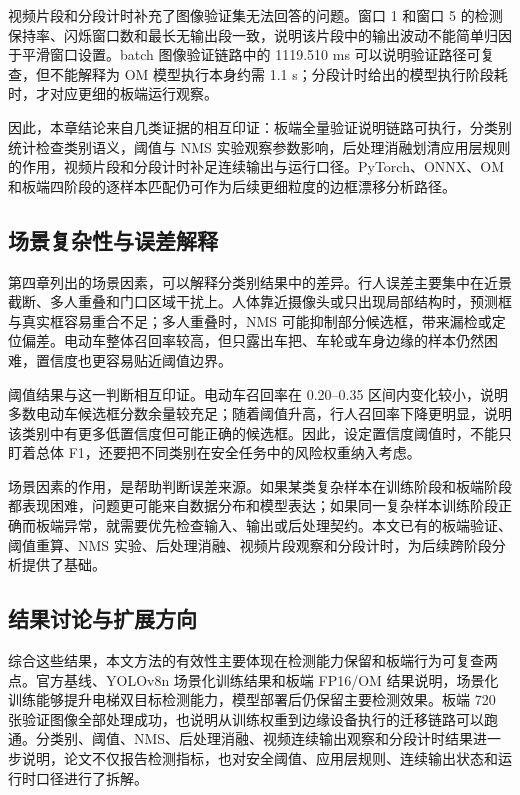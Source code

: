 视频片段和分段计时补充了图像验证集无法回答的问题。窗口 1 和窗口 5 的检测保持率、闪烁窗口数和最长无输出段一致，说明该片段中的输出波动不能简单归因于平滑窗口设置。batch 图像验证链路中的 1119.510 ms 可以说明验证路径可复查，但不能解释为 OM 模型执行本身约需 1.1 s；分段计时给出的模型执行阶段耗时，才对应更细的板端运行观察。

因此，本章结论来自几类证据的相互印证：板端全量验证说明链路可执行，分类别统计检查类别语义，阈值与 NMS 实验观察参数影响，后处理消融划清应用层规则的作用，视频片段和分段计时补足连续输出与运行口径。PyTorch、ONNX、OM 和板端四阶段的逐样本匹配仍可作为后续更细粒度的边框漂移分析路径。

\subsection{场景复杂性与误差解释}

第四章列出的场景因素，可以解释分类别结果中的差异。行人误差主要集中在近景截断、多人重叠和门口区域干扰上。人体靠近摄像头或只出现局部结构时，预测框与真实框容易重合不足；多人重叠时，NMS 可能抑制部分候选框，带来漏检或定位偏差。电动车整体召回率较高，但只露出车把、车轮或车身边缘的样本仍然困难，置信度也更容易贴近阈值边界。

阈值结果与这一判断相互印证。电动车召回率在 0.20--0.35 区间内变化较小，说明多数电动车候选框分数余量较充足；随着阈值升高，行人召回率下降更明显，说明该类别中有更多低置信度但可能正确的候选框。因此，设定置信度阈值时，不能只盯着总体 F1，还要把不同类别在安全任务中的风险权重纳入考虑。

场景因素的作用，是帮助判断误差来源。如果某类复杂样本在训练阶段和板端阶段都表现困难，问题更可能来自数据分布和模型表达；如果同一复杂样本训练阶段正确而板端异常，就需要优先检查输入、输出或后处理契约。本文已有的板端验证、阈值重算、NMS 实验、后处理消融、视频片段观察和分段计时，为后续跨阶段分析提供了基础。

\subsection{结果讨论与扩展方向}

综合这些结果，本文方法的有效性主要体现在检测能力保留和板端行为可复查两点。官方基线、YOLOv8n 场景化训练结果和板端 FP16/OM 结果说明，场景化训练能够提升电梯双目标检测能力，模型部署后仍保留主要检测效果。板端 720 张验证图像全部处理成功，也说明从训练权重到边缘设备执行的迁移链路可以跑通。分类别、阈值、NMS、后处理消融、视频连续输出观察和分段计时结果进一步说明，论文不仅报告检测指标，也对安全阈值、应用层规则、连续输出状态和运行时口径进行了拆解。

